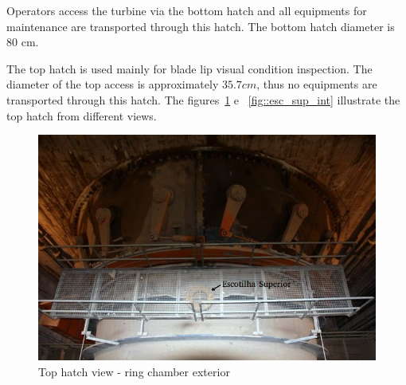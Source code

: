 Operators access the turbine via the bottom hatch and all equipments for
maintenance are transported through this hatch. The bottom hatch diameter is
80 cm.

The top hatch is used mainly for blade lip visual condition inspection. The
diameter of the top access is approximately $35.7cm$, thus no equipments
are transported through this hatch. The figures~\ref{fig::esc_sup_ext} e
~\ref{fig::esc_sup_int} illustrate the top hatch from different views.

\begin{figure}[h!]	
	\includegraphics[width=\columnwidth]{figs/viagem/2015_04_28/UG/img_4979_mod}
	\caption{Top hatch view - ring chamber exterior}
	\label{fig::esc_sup_ext}
\end{figure}

